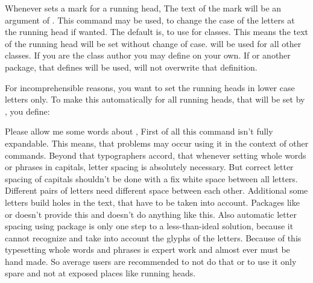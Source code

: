 \begin{Declaration}
\end{Declaration}
%
Whenever  sets a mark for a running head, The text of the
mark will be an argument of . This command may be used, to
change the case of the letters at the running head if wanted. The default is,
to use
 for
\KOMAScript{} classes. This means the text of the running head will be set
without change of case.
will be used for all other classes. If you are the class author you may define
 on your own. If  or another package,
that defines  will be used,  will not
overwrite that definition.
\begin{Example}
  For incomprehensible reasons, you want to set the running heads in lower
  case letters only. To make this automatically for all running heads, that
  will be set by , you define:
\begin{lstcode}
  \let\MakeMarkcase\MakeLowercase
\end{lstcode}
\end{Example}
Please allow me some words about , First
of all this command isn't fully expandable. This means, that problems may
occur using it in the context of other commands. Beyond that typographers
accord, that whenever setting whole words or phrases in capitals, letter
spacing is absolutely necessary. But correct letter spacing of capitals
shouldn't be done with a fix white space between all letters. Different pairs
of letters need different space between each other. Additional some letters
build holes in the text, that have to be taken into account. Packages like
 or  doesn't provide this and
 doesn't do anything like this. Also automatic letter
spacing using package  is only one step to a
less-than-ideal solution, because it cannot recognize and take into account
the glyphs of the letters. Because of this typesetting
whole words and phrases is expert work and almost ever must be hand made. So
average users are recommended to not do that or to use it only spare and not
at exposed places like running heads.%
%

